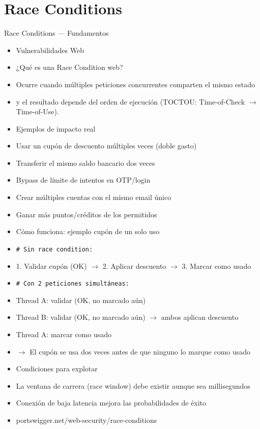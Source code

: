 \documentclass[aspectratio=169,10pt]{beamer}
\newcommand{\cmd}[1]{\texttt{\color{uznavy}#1}}
\begin{document}
\section{Race Conditions}

\begin{frame}[allowframebreaks]{Race Conditions --- Fundamentos}
\small
  \begin{itemize}
  \item Vulnerabilidades Web
  \item ¿Qué es una Race Condition web?
  \item Ocurre cuando múltiples peticiones concurrentes comparten el mismo estado
  \item y el resultado depende del orden de ejecución (TOCTOU: Time-of-Check $\rightarrow$ Time-of-Use).
  \item Ejemplos de impacto real
  \item Usar un cupón de descuento múltiples veces (doble gasto)
  \item Transferir el mismo saldo bancario dos veces
  \item Bypass de límite de intentos en OTP/login
  \item Crear múltiples cuentas con el mismo email único
  \item Ganar más puntos/créditos de los permitidos
  \item Cómo funciona: ejemplo cupón de un solo uso
  \item \cmd{\# Sin race condition:}
  \item 1. Validar cupón (OK) $\rightarrow$ 2. Aplicar descuento $\rightarrow$ 3. Marcar como usado
  \item \cmd{\# Con 2 peticiones simultáneas:}
  \item Thread A: validar (OK, no marcado aún)
  \item Thread B: validar (OK, no marcado aún) $\rightarrow$ ambos aplican descuento
  \item Thread A: marcar como usado
  \item $\rightarrow$ El cupón se usa dos veces antes de que ninguno lo marque como usado
  \item Condiciones para explotar
  \item La ventana de carrera (race window) debe existir aunque sea millisegundos
  \item Conexión de baja latencia mejora las probabilidades de éxito
  \item portswigger.net/web-security/race-conditions
  \end{itemize}
\end{frame}
\end{document}
